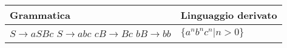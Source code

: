 \documentclass{standalone}
\begin{document}
\begin{tabularx}{\textwidth}{|X |X |}
	\toprule
		Grammatica & Linguaggio derivato \\
    \hline
        $S \to aSBc$ \newline
        $S \to abc$ \newline
        $cB \to Bc$ \newline
        $bB \to bb$
        & 
        $\{a^nb^nc^n | n>0\}$ 
        \\
    \bottomrule
\end{tabularx}
\end{document}
